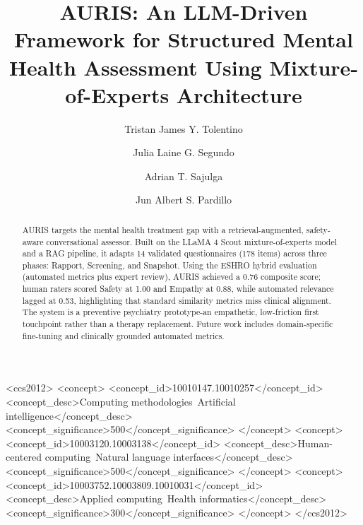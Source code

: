 ﻿\documentclass[acmsmall,screen]{acmart}
\begin{document}
\title{AURIS: An LLM-Driven Framework for Structured Mental Health Assessment Using Mixture-of-Experts Architecture}

\author{Tristan James Y. Tolentino}

\author{Julia Laine G. Segundo}

\author{Adrian T. Sajulga}

\author{Jun Albert S. Pardillo}

\begin{CCSXML}
<ccs2012>
<concept>
<concept_id>10010147.10010257</concept_id>
<concept_desc>Computing methodologies~Artificial intelligence</concept_desc>
<concept_significance>500</concept_significance>
</concept>
<concept>
<concept_id>10003120.10003138</concept_id>
<concept_desc>Human-centered computing~Natural language interfaces</concept_desc>
<concept_significance>500</concept_significance>
</concept>
<concept>
<concept_id>10003752.10003809.10010031</concept_id>
<concept_desc>Applied computing~Health informatics</concept_desc>
<concept_significance>300</concept_significance>
</concept>
</ccs2012>
\end{CCSXML}


\begin{abstract}
AURIS targets the mental health treatment gap with a retrieval-augmented, safety-aware conversational assessor. Built on the LLaMA 4 Scout mixture-of-experts model and a RAG pipeline, it adapts 14 validated questionnaires (178 items) across three phases: Rapport, Screening, and Snapshot. Using the ESHRO hybrid evaluation (automated metrics plus expert review), AURIS achieved a 0.76 composite score; human raters scored Safety at 1.00 and Empathy at 0.88, while automated relevance lagged at 0.53, highlighting that standard similarity metrics miss clinical alignment. The system is a preventive psychiatry prototype-an empathetic, low-friction first touchpoint rather than a therapy replacement. Future work includes domain-specific fine-tuning and clinically grounded automated metrics.
\end{abstract}
\end{document}
